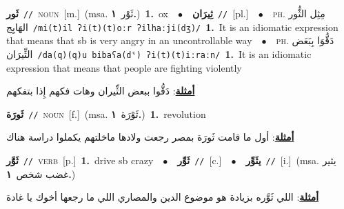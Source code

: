 \documentclass[10pt,a4paper,twoside]{article} %
\begin{document}
\begin{multicols}{2}
{\setlength\topsep{0pt}\textbf{\foreignlanguage{arabic}{ثَور}}\ {\color{gray}\texttt{//}\color{black}}\ \textsc{noun}\ [m.]\ \color{gray}(msa. \foreignlanguage{arabic}{ثَوْر}~\foreignlanguage{arabic}{\textbf{١.}})\color{black}\ \textbf{1.}~ox\ \ $\bullet$\ \ \setlength\topsep{0pt}\textbf{\foreignlanguage{arabic}{ثِيرَان}}\ {\color{gray}\texttt{//}\color{black}}\ [pl.]\ \ $\bullet$\ \ \textsc{ph.} \color{gray} \foreignlanguage{arabic}{مِثِل الثُّور الهَايِج}\color{black}\ {\color{gray}\texttt{/{\sffamily mi(t)il ʔi(t)(t)oːr ʔilhaːji(dʒ)}/}\color{black}}\ \textbf{1.}~It is an idiomatic expression that means that sb is very angry in an uncontrollable way\ \ $\bullet$\ \ \textsc{ph.} \color{gray} \foreignlanguage{arabic}{دَقُّوَا بِبَعَض الثِّيرَان}\color{black}\ {\color{gray}\texttt{/{\sffamily da(q)(q)u bibaʕa(dˤ) ʔi(t)(t)iːraːn}/}\color{black}}\ \textbf{1.}~It is an idiomatic expression that means that people are fighting violently\  \begin{flushright}\color{gray}\foreignlanguage{arabic}{\textbf{\underline{\foreignlanguage{arabic}{أمثلة}}}: دَقُّوا ببعض الثِّيران وهات فكهم إِذا بتفكهم}\end{flushright}\color{black}} \vspace{2mm}

{\setlength\topsep{0pt}\textbf{\foreignlanguage{arabic}{ثَورَة}}\ {\color{gray}\texttt{//}\color{black}}\ \textsc{noun}\ [f.]\ \color{gray}(msa. \foreignlanguage{arabic}{ثَوْرَة}~\foreignlanguage{arabic}{\textbf{١.}})\color{black}\ \textbf{1.}~revolution\  \begin{flushright}\color{gray}\foreignlanguage{arabic}{\textbf{\underline{\foreignlanguage{arabic}{أمثلة}}}: أول ما قامت ثَورَة بمصر رجعت ولادها ماخلتهم يكملوا دراسة هناك}\end{flushright}\color{black}} \vspace{2mm}

{\setlength\topsep{0pt}\textbf{\foreignlanguage{arabic}{ثَوَّر}}\ {\color{gray}\texttt{//}\color{black}}\ \textsc{verb}\ [p.]\ \textbf{1.}~drive sb crazy\ \ $\bullet$\ \ \setlength\topsep{0pt}\textbf{\foreignlanguage{arabic}{ثَوِّر}}\ {\color{gray}\texttt{//}\color{black}}\ [c.]\ \ $\bullet$\ \ \setlength\topsep{0pt}\textbf{\foreignlanguage{arabic}{يثَوِّر}}\ {\color{gray}\texttt{//}\color{black}}\ [i.]\ \color{gray}(msa. \foreignlanguage{arabic}{يثير غضب شخص}~\foreignlanguage{arabic}{\textbf{١.}})\color{black}\  \begin{flushright}\color{gray}\foreignlanguage{arabic}{\textbf{\underline{\foreignlanguage{arabic}{أمثلة}}}: اللي ثَوَّره بزيادة هو موضوع الدين والمصاري اللي ما رجعها أخوك يا غادة}\end{flushright}\color{black}} \vspace{2mm}


\end{multicols}
\end{document}
